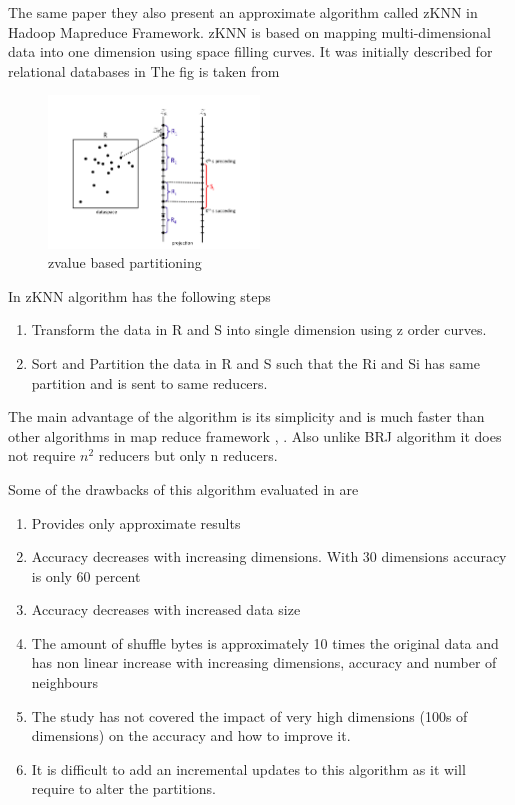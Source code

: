 \documentclass[conference]{IEEEtran}
\begin{document}
\bigskip

The same paper they also present an approximate algorithm called zKNN
in Hadoop Mapreduce Framework. zKNN is based on mapping
multi-dimensional data into one dimension using space filling
curves. It was initially described for relational databases in \cite{yao_k_2010}
The fig is taken from \cite{song_solutions_2015}

\begin{figure}[here]
\includegraphics[width=0.5\textwidth]{zknn.png}
\caption{zvalue based partitioning}
\label{fig:zknn.png}
\end{figure}

\bigskip

In zKNN algorithm has the following steps
\begin{enumerate}
\item Transform the data in R and S into single dimension using z order
  curves.
\item Sort and Partition the data in R and S such that the Ri and Si
  has same partition and is sent to same reducers.
\end{enumerate}

\bigskip

The main advantage of the algorithm is its simplicity and is much
faster than other algorithms in map reduce framework
\cite{lu_efficient_2012},
\cite{stupar_rankreduceprocessing_2010}. Also unlike BRJ algorithm it
does not require $n^2$ reducers but only n reducers.

\medskip

Some of the drawbacks of this algorithm evaluated in
\cite{song_solutions_2015} are
\begin{enumerate}
\item Provides only approximate results
\item Accuracy decreases with increasing dimensions. With 30 dimensions
  accuracy is only 60 percent
\item Accuracy decreases with increased data size
\item The amount of shuffle bytes is approximately 10 times the
  original data and has non linear increase with increasing dimensions, accuracy and
  number of neighbours
\item The study has not covered the impact of very high dimensions
  (100s of dimensions) on the accuracy and how to improve it.
\item It is difficult to add an incremental updates to this algorithm
  as it will require to alter the partitions.
\end{enumerate}
\end{document}
